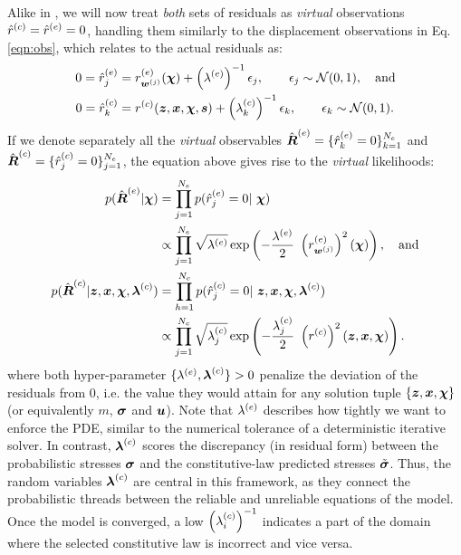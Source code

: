 Alike in \cite{scholz2025weak, kaltenbach2020incorporating}, we will now treat \textit{both} sets of residuals as \textit{virtual} observations $\hat{r}^{(c)} = \hat{r}^{(e)} = 0$, handling them similarly to the displacement observations in Eq. \ref{eqn:obs}, which relates to the actual residuals as:
\begin{align}
    0=\hat{r}^{(e)}_{j} &= r^{(e)}_{\boldsymbol{w}^{(j)} }(\boldsymbol{\chi})+\left(\lambda^{(e)}\right)^{-1}\epsilon_j, \qquad \epsilon_j \sim \mathcal{N}(0,1), \quad \mathrm{and} \\
    0=\hat{r}^{(c)}_k &= r^{(c)}(\boldsymbol{z},\boldsymbol{x}, \boldsymbol{\chi}, \boldsymbol{s})+\left(\lambda^{(c)}_k \right)^{-1}\epsilon_k, \qquad \epsilon_k \sim \mathcal{N}(0,1).
\end{align}
If we denote separately all the {\em virtual} observables  $\hat{\boldsymbol{R}}^{(e)}=\{ \hat{r}^{(e)}_k=0 \}_{k=1}^{N_e}$ and $\hat{\boldsymbol{R}}^{(c)}=\{ \hat{r}^{(c)}_j=0 \}_{j=1}^{N_e}$, the equation above gives rise to the {\em virtual} likelihoods:
\begin{align}
    p(\hat{\boldsymbol{R}}^{(e)} | \boldsymbol{\chi}) & =\prod_{j=1}^{N_e} p(\hat{r}^{(e)}_j=0 | ~\boldsymbol{\chi}) \\
 & \propto \prod_{j=1}^{N_e} \sqrt{\lambda^{(e)}}  \exp\left(  - \frac{\lambda^{(e)}}{2} ~\left(r^{(e)}_{\boldsymbol{w}^{(j)}}\right)^2(\boldsymbol{\chi}) \right), \quad \mathrm{and} \\
     p(\hat{\boldsymbol{R}}^{(c)} | \boldsymbol{z},\boldsymbol{x}, \boldsymbol{\chi}, \boldsymbol{\lambda}^{(c)}) & =\prod_{h=1}^{N_c} p(\hat{r}^{(c)}_j=0 | ~\boldsymbol{z},\boldsymbol{x}, \boldsymbol{\chi}, \boldsymbol{\lambda}^{(c)}) \\
 & \propto \prod_{j=1}^{N_c} \sqrt{\lambda^{(c)}_j}  \exp\left(  - \frac{\lambda^{(c)}_j}{2} ~\left(r^{(c)}\right)^2(\boldsymbol{z},\boldsymbol{x}, \boldsymbol{\chi}) \right).
\end{align}
where both hyper-parameter  $\{\lambda^{(e)}, \boldsymbol{\lambda}^{(c)}\}>0$ penalize the deviation of the residuals from $0$, i.e. the value they would attain for any solution tuple $\{ \boldsymbol{z},\boldsymbol{x}, \boldsymbol{\chi} \}$ (or equivalently $m$, $\boldsymbol{\sigma}$ and $\boldsymbol{u}$). Note that $\lambda^{(e)}$ describes how tightly we want to enforce the PDE, similar to the numerical tolerance of a deterministic iterative solver. In contrast, $\boldsymbol{\lambda}^{(c)}$ scores the discrepancy (in residual form) between the probabilistic stresses $\boldsymbol{\sigma}$ and the constitutive-law predicted stresses $\tilde{\boldsymbol{\sigma}}$. Thus, the random variables $\boldsymbol{\lambda}^{(c)}$ are central in this framework, as they connect the probabilistic threads between the reliable and unreliable equations of the model. Once the model is converged, a low $\left(\lambda^{(c)}_i\right)^{-1}$ indicates a part of the domain where the selected constitutive law is incorrect and vice versa.

